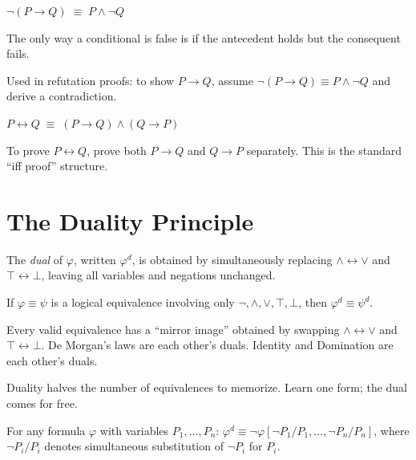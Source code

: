 \begin{proposition}\label{eq:neg-cond}
$\neg(P \rightarrow Q) \;\equiv\; P \wedge \neg Q$
\end{proposition}
\begin{remark}[Intuition] The only way a conditional is false is if the antecedent
holds but the consequent fails.
\end{remark}
\begin{remark}[Consequence] Used in refutation proofs: to show $P \rightarrow Q$,
assume $\neg(P \rightarrow Q) \equiv P \wedge \neg Q$ and derive a contradiction.
\end{remark}

\begin{proposition}\label{eq:bicond-exp}
$P \leftrightarrow Q \;\equiv\; (P \rightarrow Q) \wedge (Q \rightarrow P)$
\end{proposition}
\begin{remark} To prove $P \leftrightarrow Q$, prove both
$P \rightarrow Q$ and $Q \rightarrow P$ separately. This is the standard
``iff proof'' structure.
\end{remark}

\section*{The Duality Principle}

\begin{tcolorbox}[colback=propbox, colframe=propborder, arc=2pt,
  left=6pt, right=6pt, top=4pt, bottom=4pt,
  title={\small\textbf{Definition (Dual Formula)}},
  fonttitle=\small\bfseries]
The \emph{dual} of $\varphi$, written $\varphi^d$, is obtained by simultaneously
replacing $\wedge \leftrightarrow \vee$ and $\top \leftrightarrow \bot$, leaving
all variables and negations unchanged.
\end{tcolorbox}

\begin{tcolorbox}[colback=thmbox, colframe=thmborder, arc=2pt,
  left=6pt, right=6pt, top=4pt, bottom=4pt,
  title={\small\textbf{Theorem (Duality Principle)}},
  fonttitle=\small\bfseries]
\label{thm:pl-duality}
If $\varphi \equiv \psi$ is a logical equivalence involving only
$\neg, \wedge, \vee, \top, \bot$, then $\varphi^d \equiv \psi^d$.
\end{tcolorbox}

\begin{remark}[Intuition] Every valid equivalence has a ``mirror image'' obtained
by swapping $\wedge\leftrightarrow\vee$ and $\top\leftrightarrow\bot$. De Morgan's
laws are each other's duals. Identity and Domination are each other's duals.
\end{remark}
\begin{remark}[Consequence] Duality halves the number of equivalences to memorize.
Learn one form; the dual comes for free.
\end{remark}
\begin{remark}[Formally]
For any formula $\varphi$ with variables $P_1,\dots,P_n$:
$\varphi^d \equiv \neg\varphi[\neg P_1/P_1, \dots, \neg P_n/P_n]$,
where $\neg P_i / P_i$ denotes simultaneous substitution of $\neg P_i$ for $P_i$.
\end{remark}
